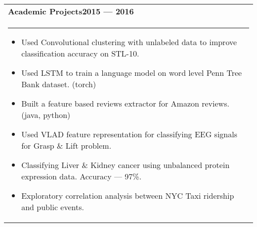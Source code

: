 \documentclass{article}
\begin{document}
\begin{tabular}{p{\dimexpr\linewidth-2\tabcolsep}}
	\bfseries \large{Academic Projects}\hfill 2015 --- 2016 \mdseries \\
	\noindent\rule{\textwidth}{0.4pt}
	\begin{itemize}
		\item Used Convolutional clustering with unlabeled data to improve classification accuracy on STL-10.
		\item Used LSTM to train a language model on word level Penn Tree Bank dataset. (torch)
		\item Built a feature based reviews extractor for Amazon reviews. (java, python)
		\item Used VLAD feature representation for classifying EEG signals for Grasp \& Lift problem.
		\item Classifying Liver \& Kidney cancer using unbalanced protein expression data. Accuracy --- 97\%.
		\item Exploratory correlation analysis between NYC Taxi ridership and public events.
	\end{itemize}
\end{tabular}
\end{document}

